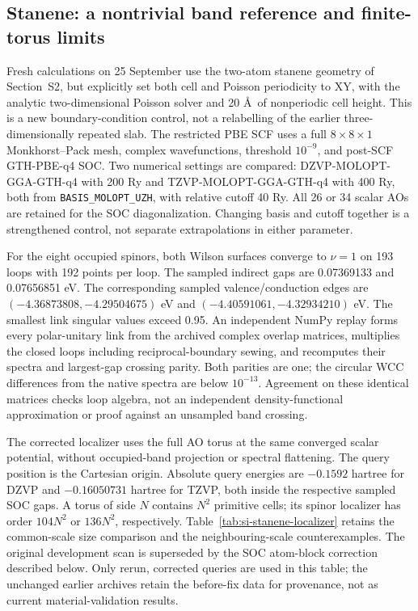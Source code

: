 \documentclass[11pt]{article}
\begin{document}
\subsection{Stanene: a nontrivial band reference and finite-torus limits}
\label{sec:si-stanene-localizer}
Fresh calculations on 25 September use the two-atom stanene geometry
of Section~S2, but explicitly set both cell and Poisson periodicity
to XY, with the analytic two-dimensional Poisson solver and 20 \AA\
of nonperiodic cell height. This is a new boundary-condition control,
not a relabelling of the earlier three-dimensionally repeated slab.
The restricted PBE SCF uses a full $8\times8\times1$ Monkhorst--Pack
mesh, complex wavefunctions, threshold $10^{-9}$, and post-SCF
GTH-PBE-q4 SOC. Two numerical settings are compared:
DZVP-MOLOPT-GGA-GTH-q4 with 200 Ry and
TZVP-MOLOPT-GGA-GTH-q4 with 400 Ry, both from
\texttt{BASIS\_MOLOPT\_UZH}, with relative cutoff 40 Ry.
All 26 or 34 scalar AOs are retained for the SOC diagonalization.
Changing basis and cutoff together is a strengthened control,
not separate extrapolations in either parameter.

For the eight occupied spinors, both Wilson surfaces converge to
$\nu=1$ on 193 loops with 192 points per loop. The sampled indirect
gaps are 0.07369133 and 0.07656851 eV. The corresponding sampled
valence/conduction edges are $(-4.36873808,-4.29504675)$ eV and
$(-4.40591061,-4.32934210)$ eV. The smallest link singular values
exceed 0.95. An independent NumPy replay forms every polar-unitary
link from the archived complex overlap matrices, multiplies the
closed loops including reciprocal-boundary sewing, and recomputes
their spectra and largest-gap crossing parity. Both parities are one;
the circular WCC differences from the native spectra are below
$10^{-13}$. Agreement on these identical matrices checks loop
algebra, not an independent density-functional approximation or
proof against an unsampled band crossing.

The corrected localizer uses the full AO torus at the same converged
scalar potential, without occupied-band projection or spectral flattening.
The query position is the Cartesian origin. Absolute query energies
are $-0.1592$ hartree for DZVP and $-0.16050731$ hartree for TZVP,
both inside the respective sampled SOC gaps. A torus of side $N$
contains $N^2$ primitive cells; its spinor localizer has order
$104N^2$ or $136N^2$, respectively.
Table~\ref{tab:si-stanene-localizer} retains the common-scale size
comparison and the neighbouring-scale counterexamples.
The original development scan is superseded by the SOC atom-block
correction described below. Only rerun, corrected queries are used
in this table; the unchanged earlier archives retain the before-fix
data for provenance, not as current material-validation results.
\end{document}
